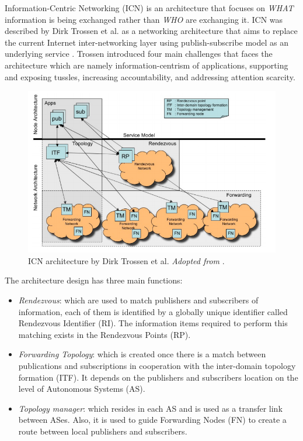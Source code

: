 Information-Centric Networking (ICN) is an architecture that focuses on \textit{WHAT} information is being exchanged rather than \textit{WHO} are exchanging it. ICN was described by Dirk Trossen et al. as a networking architecture that aims to replace the current Internet inter-networking layer using publish-subscribe model as an underlying service \cite{Trossen:2010:AII:1764873.1764878}. Trossen introduced four main challenges that faces the architecture which are namely information-centrism of applications, supporting and exposing tussles, increasing accountability, and addressing attention scarcity.
\begin{figure}[H]
	\centering
	\includegraphics[scale=0.4]{images/trossen.png}
	\caption{ICN architecture by Dirk Trossen et al. \textit{Adopted from } \cite{Trossen:2010:AII:1764873.1764878}.}
	\label{fig:trossen}
\end{figure}

\noindent The architecture  design has three main functions:
\begin{itemize}
\item \textit{Rendezvous}: which are used to match  publishers and subscribers of information, each of them is identified by a globally unique identifier called Rendezvous Identifier (RI). The information items required to perform this matching exists in the Rendezvous Points (RP).
\item \textit{Forwarding Topology}: which is created once there is a match between publications and subscriptions in cooperation with the inter-domain topology formation (ITF). It depends on the publishers and subscribers location on the level of Autonomous Systems (AS).
\item \textit{Topology manager}: which resides in each AS and is used as a transfer link between ASes. Also, it is used to guide Forwarding Nodes (FN) to create a route between local publishers and subscribers.
\end{itemize}


